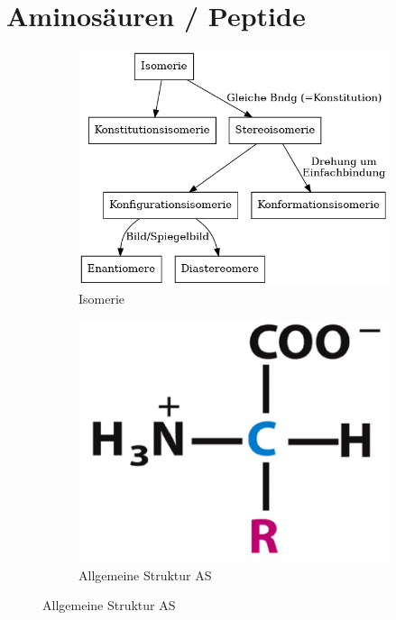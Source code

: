 \documentclass[a4paper,twocolumn,usegeometry,english,fontsize=6,DIV=16]{scrartcl}
\begin{document}
\section{Aminosäuren / Peptide}

\begin{figure}
	\centering
	\begin{subfigure}{.5\linewidth}
		\centering
		\includegraphics[width=\linewidth]{graphs/isomerie.png}
		\caption{Isomerie}
	\end{subfigure}%
	\begin{subfigure}{.4\linewidth}
		\centering
		\includegraphics[width=\linewidth]{img/as.png}
		\caption{Allgemeine Struktur AS}
	\end{subfigure}%
\end{figure}
\end{document}
